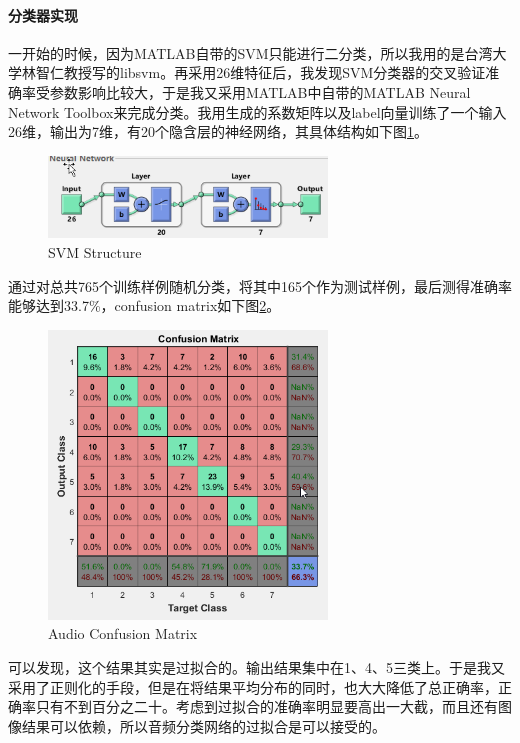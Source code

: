 \documentclass{article}
\begin{document}
\begin{multicols}{2}
                \paragraph{分类器实现}
                    一开始的时候，因为MATLAB自带的SVM只能进行二分类，所以我用的是台湾大学林智仁教授写的libsvm。再采用26维特征后，我发现SVM分类器的交叉验证准确率受参数影响比较大，于是我又采用MATLAB中自带的MATLAB Neural Network Toolbox来完成分类。我用生成的系数矩阵以及label向量训练了一个输入26维，输出为7维，有20个隐含层的神经网络，其具体结构如下图\ref{fig:2}。
                    \begin{figure}[H]
                      \centering
                      \includegraphics[width=7.4cm]{2.png}
                      \caption{SVM Structure}\label{fig:2}
                    \end{figure}
                    通过对总共765个训练样例随机分类，将其中165个作为测试样例，最后测得准确率能够达到33.7\%，confusion matrix如下图\ref{fig:1}。
                    \begin{figure}[H]
                      \centering
                      \includegraphics[width=7.4cm]{1.png}
                      \caption{Audio Confusion Matrix}\label{fig:1}
                    \end{figure}
                    可以发现，这个结果其实是过拟合的。输出结果集中在1、4、5三类上。于是我又采用了正则化的手段，但是在将结果平均分布的同时，也大大降低了总正确率，正确率只有不到百分之二十。考虑到过拟合的准确率明显要高出一大截，而且还有图像结果可以依赖，所以音频分类网络的过拟合是可以接受的。

\end{multicols}
\end{document}
